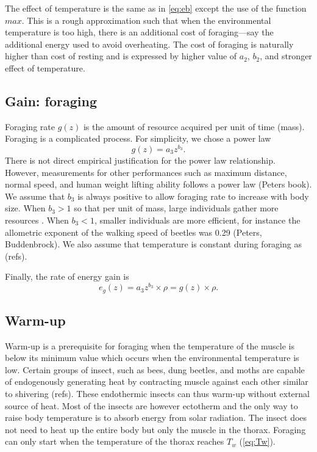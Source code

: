 The effect of temperature is the same as in \cref{eq:eb} except the use of the function $max$.
This is a rough approximation such that when the environmental temperature is too high, there is an additional cost of foraging---say the additional energy used to avoid overheating. 
The cost of foraging is naturally higher than cost of resting and is expressed by higher value of $a_2$, $b_2$, and stronger effect of temperature.

\subsection*{Gain: foraging}
Foraging rate $g(z)$ is the amount of resource acquired per unit of time (mass).
Foraging is a complicated process.
For simplicity, we chose a power law 
\[
	g(z) = a_3 z^{b_3}.
\] 
There is not direct empirical justification for the power law relationship.
However, measurements for other performances such as maximum distance, normal speed, and human weight lifting ability follows a power law (Peters book). 
We assume that $b_3$ is always positive to allow foraging rate to increase with body size.
When $b_3 > 1$ so that per unit of mass, large individuals gather more resources \citep[e.g.,][]{Nervo2014}.
When $b_3 < 1$, smaller individuals are more efficient, for instance the allometric exponent of the walking speed of beetles was 0.29 (Peters, Buddenbrock). 
We also assume that temperature is constant during foraging as (refs).

Finally, the rate of energy gain is  
\begin{equation} \label{eq:eg}
	e_g(z) = a_3 z^{b_3} \times \rho  = g(z) \times \rho.
\end{equation}

\subsection*{Warm-up}
Warm-up is a prerequisite for foraging when the temperature of the muscle is below its minimum value which occurs when the environmental temperature is low. 
Certain groups of insect, such as bees, dung beetles, and moths are capable of endogenously generating heat by contracting muscle against each other similar to shivering (refs).
These endothermic insects can thus warm-up without external source of heat. 
Most of the insects are however ectotherm and the only way to raise body temperature is to absorb energy from solar radiation.
The insect does not need to heat up the entire body but only the muscle in the thorax.
Foraging can only start when the temperature of the thorax reaches $T_w$ (\cref{eq:Tw}).

